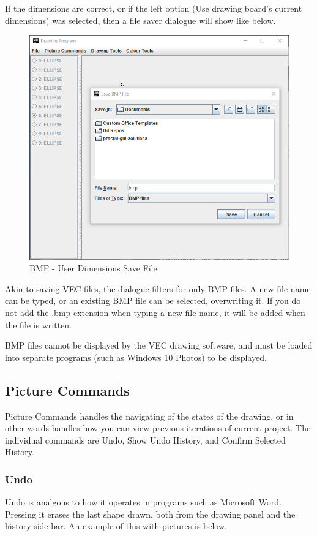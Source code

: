 \documentclass[12pt]{article} %
\begin{document}
If the dimensions are correct, or if the left option (Use drawing board's current dimensions) was selected, then a file saver dialogue will show like below.

\begin{figure}[H]
\caption{BMP - User Dimensions Save File}
\centering
\includegraphics[scale=0.75]{pictures/bmpFourthWindow.PNG}
\end{figure}

Akin to saving VEC files, the dialogue filters for only BMP files. A new file name can be typed, or an existing BMP file can be selected, overwriting it. If you do not add the .bmp extension when typing a new file name, it will be added when the file is written. 

BMP files cannot be displayed by the VEC drawing software, and must be loaded into separate programs (such as Windows 10 Photos) to be displayed.

\subsection{Picture Commands}
Picture Commands handles the navigating of the states of the drawing, or in other words handles how you can view previous iterations of current project. The individual commands are Undo, Show Undo History, and Confirm Selected History.

\subsubsection{Undo}
Undo is analgous to how it operates in programs such as Microsoft Word. Pressing it erases the last shape drawn, both from the drawing panel and the history side bar. An example of this with pictures is below.
\end{document}
